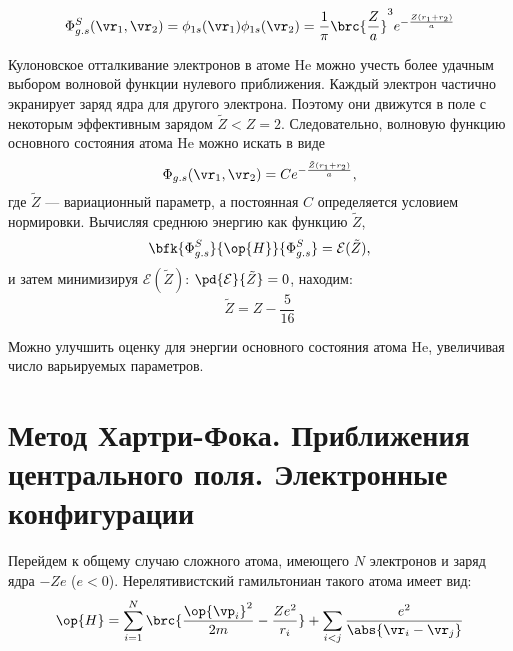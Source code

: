 \begin{equation}
\label{eq:18_1_5}
\Phi_{g.s}^{S}(\vr_1, \vr_2) = \phi_{1s}(\vr_1)\phi_{1s}(\vr_2) = \frac{1}{\pi} \brc{\frac{Z}{a}}^3 e^{-\frac{Z(r_1 + r_2)}{a}}
\end{equation}

Кулоновское отталкивание электронов в атоме He можно учесть более удачным выбором волновой функции нулевого приближения. Каждый электрон частично экранирует заряд ядра для другого электрона. Поэтому они движутся в поле с некоторым эффективным зарядом $\tilde{Z} < Z = 2$. Следовательно, волновую функцию основного состояния атома He можно искать в виде
\begin{equation}
\label{eq:18_1_6}
\Phi_{g.s}(\vr_1, \vr_2) = C e^{-\frac{\tilde{Z}(r_1 + r_2)}{a}},
\end{equation}
где $\tilde{Z}$ --- вариационный параметр, а постоянная $C$ определяется условием нормировки. Вычисляя среднюю энергию как функцию $\tilde{Z}$,
$$
\bfk{\Phi_{g.s}^{S}}{\op{H}}{\Phi_{g.s}^{S}} = \mathcal{E}(\tilde{Z}),
$$
и затем минимизируя $\mathcal{E}(\tilde{Z})$: $\pd{\mathcal{E}}{\tilde{Z}} = 0$, находим:
$$
\tilde{Z} = Z - \frac{5}{16}
$$

Можно улучшить оценку для энергии основного состояния атома He, увеличивая число варьируемых параметров.

\section{Метод Хартри-Фока. Приближения центрального поля. Электронные конфигурации}

Перейдем к общему случаю сложного атома, имеющего $N$ электронов и заряд ядра $-Ze$ ($e<0$). Нерелятивистский гамильтониан такого атома имеет вид:
\begin{equation}
\label{eq:18_2_1}
\op{H} = \sum_{i=1}^{N} \brc{\frac{\op{\vp_i}^2}{2m} - \frac{Ze^2}{r_i}} + \sum_{i<j} \frac{e^2}{\abs{\vr_i - \vr_j}}
\end{equation}

